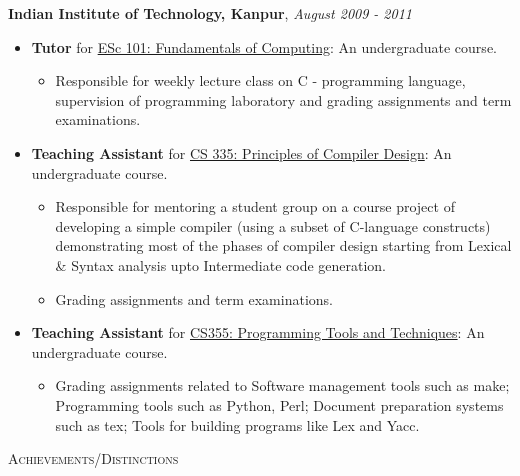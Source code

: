 \documentclass[9pt]{article}
\newenvironment{changemargin}[2]{%
  \begin{list}{}{%
    \setlength{\topsep}{0pt}%
    \setlength{\leftmargin}{#1}%
    \setlength{\rightmargin}{#2}%
    \setlength{\listparindent}{\parindent}%
    \setlength{\itemindent}{\parindent}%
    \setlength{\parsep}{\parskip}%
  }%
  \item[]}{\end{list}
}
\newcommand{\lineover}{
	\begin{changemargin}{-0.05in}{-0.05in}
		\vspace*{-8pt}
		\hrulefill \\
		\vspace*{-2pt}
	\end{changemargin}
}
\newcommand{\header}[1]{
	\begin{changemargin}{-0.5in}{-0.5in}
		\scshape{#1}\\
  	\lineover
	\end{changemargin}
}
\newenvironment{body} {
	\vspace*{-16pt}
	\begin{changemargin}{-0.25in}{-0.5in}
  }	
	{\end{changemargin}
}
\begin{document}
\begin{body}
	\textbf{Indian Institute of Technology, Kanpur},  \hfill \emph{August 2009 - 2011}\\
	\vspace*{-4pt}
	\begin{itemize} \itemsep -0pt  %
		\item \textbf{Tutor} for \href{http://www.cse.iitk.ac.in/teaching/courses/ESc101.html}{ESc 101: Fundamentals of Computing}: An undergraduate course.
			\begin{itemize}
				\item Responsible for weekly lecture class on C - programming language, supervision of programming laboratory and grading assignments and term examinations.
			\end{itemize}
		\item \textbf{Teaching Assistant} for \href{http://www.cse.iitk.ac.in/teaching/courses/CS335.html}{CS 335: Principles of Compiler Design}: An undergraduate course.
			\begin{itemize}
				\item Responsible for mentoring a student group on a course project of developing a simple compiler (using a subset of C-language constructs) demonstrating most of the phases of compiler design starting from Lexical \& Syntax analysis upto Intermediate code generation.
				\item Grading assignments and term examinations.
			\end{itemize}
		\item \textbf{Teaching Assistant} for \href{http://www.cse.iitk.ac.in/teaching/courses/CS355.html}{CS355: Programming Tools and Techniques}: An undergraduate course.
			\begin{itemize}
				\item Grading assignments related to Software management tools such as make; Programming tools such as Python, Perl; Document preparation systems such as tex; Tools for building programs like Lex and Yacc.
			\end{itemize}
	\end{itemize}
\end{body}

\smallskip

\header{Achievements/Distinctions}
\end{document}
